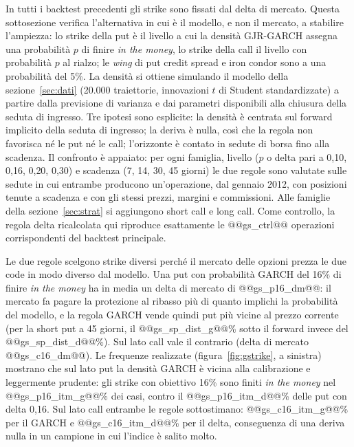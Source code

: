 \documentclass[11pt,a4paper]{article}
\begin{document}
In tutti i backtest precedenti gli strike sono fissati dal delta di mercato. Questa sottosezione verifica l'alternativa in cui è il modello, e non il mercato, a stabilire l'ampiezza: lo strike della put è il livello a cui la densità GJR-GARCH assegna una probabilità $p$ di finire \emph{in the money}, lo strike della call il livello con probabilità $p$ al rialzo; le \emph{wing} di put credit spread e iron condor sono a una probabilità del 5\%. La densità si ottiene simulando il modello della sezione~\ref{sec:dati} (20.000 traiettorie, innovazioni $t$ di Student standardizzate) a partire dalla previsione di varianza e dai parametri disponibili alla chiusura della seduta di ingresso. Tre ipotesi sono esplicite: la densità è centrata sul forward implicito della seduta di ingresso; la deriva è nulla, così che la regola non favorisca né le put né le call; l'orizzonte è contato in sedute di borsa fino alla scadenza. Il confronto è appaiato: per ogni famiglia, livello ($p$ o delta pari a 0{,}10, 0{,}16, 0{,}20, 0{,}30) e scadenza (7, 14, 30, 45 giorni) le due regole sono valutate sulle sedute in cui entrambe producono un'operazione, dal gennaio 2012, con posizioni tenute a scadenza e con gli stessi prezzi, margini e commissioni. Alle famiglie della sezione~\ref{sec:strat} si aggiungono short call e long call. Come controllo, la regola delta ricalcolata qui riproduce esattamente le @@gs_ctrl@@ operazioni corrispondenti del backtest principale.

Le due regole scelgono strike diversi perché il mercato delle opzioni prezza le due code in modo diverso dal modello. Una put con probabilità GARCH del 16\% di finire \emph{in the money} ha in media un delta di mercato di @@gs_p16_dm@@: il mercato fa pagare la protezione al ribasso più di quanto implichi la probabilità del modello, e la regola GARCH vende quindi put più vicine al prezzo corrente (per la short put a 45 giorni, il @@gs_sp_dist_g@@\% sotto il forward invece del @@gs_sp_dist_d@@\%). Sul lato call vale il contrario (delta di mercato @@gs_c16_dm@@). Le frequenze realizzate (figura~\ref{fig:gstrike}, a sinistra) mostrano che sul lato put la densità GARCH è vicina alla calibrazione e leggermente prudente: gli strike con obiettivo 16\% sono finiti \emph{in the money} nel @@gs_p16_itm_g@@\% dei casi, contro il @@gs_p16_itm_d@@\% delle put con delta 0{,}16. Sul lato call entrambe le regole sottostimano: @@gs_c16_itm_g@@\% per il GARCH e @@gs_c16_itm_d@@\% per il delta, conseguenza di una deriva nulla in un campione in cui l'indice è salito molto.
\end{document}
